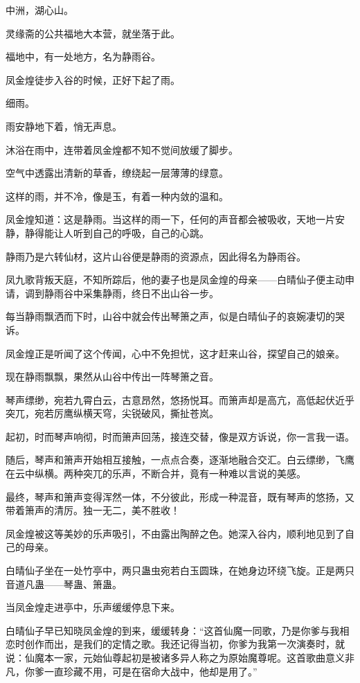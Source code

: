 
\begin{this_body}

中洲，湖心山。

灵缘斋的公共福地大本营，就坐落于此。

福地中，有一处地方，名为静雨谷。

凤金煌徒步入谷的时候，正好下起了雨。

细雨。

雨安静地下着，悄无声息。

沐浴在雨中，连带着凤金煌都不知不觉间放缓了脚步。

空气中透露出清新的草香，缭绕起一层薄薄的绿意。

这样的雨，并不冷，像是玉，有着一种内敛的温和。

凤金煌知道：这是静雨。当这样的雨一下，任何的声音都会被吸收，天地一片安静，静得能让人听到自己的呼吸，自己的心跳。

静雨乃是六转仙材，这片山谷便是静雨的资源点，因此得名为静雨谷。

凤九歌背叛天庭，不知所踪后，他的妻子也是凤金煌的母亲——白晴仙子便主动申请，调到静雨谷中采集静雨，终日不出山谷一步。

每当静雨飘洒而下时，山谷中就会传出琴箫之声，似是白晴仙子的哀婉凄切的哭诉。

凤金煌正是听闻了这个传闻，心中不免担忧，这才赶来山谷，探望自己的娘亲。

现在静雨飘飘，果然从山谷中传出一阵琴箫之音。

琴声缥缈，宛若九霄白云，古意昂然，悠扬悦耳。而箫声却是高亢，高低起伏近乎突兀，宛若厉鹰纵横天穹，尖锐破风，撕扯苍岚。

起初，时而琴声响彻，时而箫声回荡，接连交替，像是双方诉说，你一言我一语。

随后，琴声和箫声开始相互接触，一点点合奏，逐渐地融合交汇。白云缥缈，飞鹰在云中纵横。两种突兀的乐声，不断合并，竟有一种难以言说的美感。

最终，琴声和箫声变得浑然一体，不分彼此，形成一种混音，既有琴声的悠扬，又带着箫声的清厉。独一无二，美不胜收！

凤金煌被这等美妙的乐声吸引，不由露出陶醉之色。她深入谷内，顺利地见到了自己的母亲。

白晴仙子坐在一处竹亭中，两只蛊虫宛若白玉圆珠，在她身边环绕飞旋。正是两只音道凡蛊——琴蛊、箫蛊。

当凤金煌走进亭中，乐声缓缓停息下来。

白晴仙子早已知晓凤金煌的到来，缓缓转身：“这首仙魔一同歌，乃是你爹与我相恋时创作而出，是我们的定情之歌。我还记得当初，你爹为我第一次演奏时，就说：仙魔本一家，元始仙尊起初是被诸多异人称之为原始魔尊呢。这首歌曲意义非凡，你爹一直珍藏不用，可是在宿命大战中，他却是用了。”


\end{this_body}
